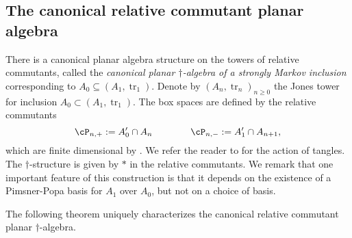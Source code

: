 \documentclass[11pt]{article}
\theoremstyle{plain}
\theoremstyle{definition}
\DeclareMathOperator{\tr}{tr}
\begin{document}
\subsection{The canonical relative commutant planar algebra}%
\label{sec:StronglyMarkovPA}


There is a canonical planar algebra structure on the towers of relative commutants, called the \textit{canonical planar $\dag$-algebra of a strongly Markov inclusion} corresponding to $A_0\subseteq (A_1,\tr_1)$. 
Denote by $(A_n,\tr_n)_{n\geq 0}$ the Jones tower for inclusion $A_0\subset (A_1,\tr_1)$.
The box spaces are defined by the relative commutants
$$
\cP_{n,+}:=A_0'\cap A_{n} 
\qquad\qquad
\cP_{n,-}:=A_1'\cap A_{n+1},
$$
which are finite dimensional by \cite[Prop.~2.7.3]{MR996807}.
We refer the reader to \cite[\S2.3]{MR2812459} for the action of tangles.
The $\dag$-structure is given by $*$ in the relative commutants. 
We remark that one important feature of this construction is that it depends on the existence of a Pimsner-Popa basis for $A_1$ over $A_0$, but not on a choice of basis. 

The following theorem uniquely characterizes the canonical relative commutant planar $\dag$-algebra.
\end{document}
